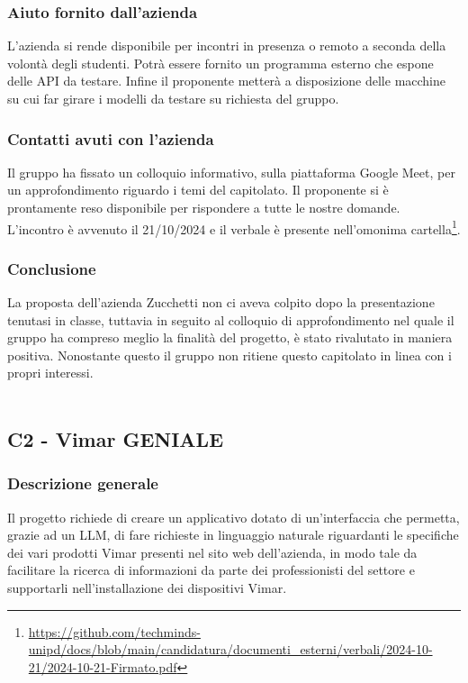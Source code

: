 \documentclass[10pt]{article}
\begin{document}
\subsubsection{Aiuto fornito dall'azienda}
L'azienda si rende disponibile per incontri in presenza o remoto a seconda della volontà degli studenti. Potrà essere fornito un programma esterno che espone delle API da testare. Infine il proponente metterà a disposizione delle macchine su cui far girare i modelli da testare su richiesta del gruppo.
\subsubsection{Contatti avuti con l'azienda}
Il gruppo ha fissato un colloquio informativo, sulla piattaforma Google Meet, per un approfondimento riguardo i temi del capitolato. Il proponente si è prontamente reso disponibile per rispondere a tutte le nostre domande. L'incontro è avvenuto il 21/10/2024 e il verbale è presente nell'omonima cartella\footnote{\url{https://github.com/techminds-unipd/docs/blob/main/candidatura/documenti_esterni/verbali/2024-10-21/2024-10-21-Firmato.pdf}}.

\subsubsection{Conclusione}
La proposta dell'azienda Zucchetti non ci aveva colpito dopo la presentazione tenutasi in classe, tuttavia in seguito al colloquio di approfondimento nel quale il gruppo ha compreso meglio la finalità del progetto, è stato rivalutato in maniera positiva. Nonostante questo il gruppo non ritiene questo capitolato in linea con i propri interessi.
\\\\
\subsection{C2 - Vimar GENIALE}
\subsubsection{Descrizione generale}
Il progetto richiede di creare un applicativo dotato di un’interfaccia che permetta, grazie ad un LLM, di fare richieste in linguaggio naturale riguardanti le specifiche dei vari prodotti Vimar presenti nel sito web dell’azienda, in modo tale da facilitare la ricerca di informazioni da parte dei professionisti del settore e supportarli nell’installazione dei dispositivi Vimar.
\end{document}
